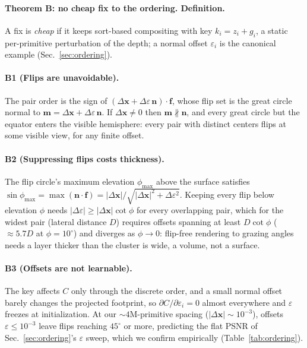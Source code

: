 \paragraph{Theorem B: no cheap fix to the ordering. Definition.} A fix is \emph{cheap} if it keeps
sort-based compositing with key $k_i=z_i+g_i$, a static per-primitive perturbation of the depth; a
normal offset $\varepsilon_i$ is the canonical example (Sec.~\ref{sec:ordering}).

\paragraph{B1 (Flips are unavoidable).} The pair order is the sign of
$(\Delta\mathbf{x}+\Delta\varepsilon\,\mathbf{n})\cdot\mathbf{f}$, whose flip set is the great
circle normal to $\mathbf{m}=\Delta\mathbf{x}+\Delta\varepsilon\,\mathbf{n}$. If
$\Delta\mathbf{x}\ne0$ then $\mathbf{m}\not\parallel\mathbf{n}$, and every great circle but the
equator enters the visible hemisphere: every pair with distinct centers flips at some visible view,
for any finite offset.

\paragraph{B2 (Suppressing flips costs thickness).} The flip circle's maximum elevation $\phi_{\max}$ above the surface satisfies
$\sin\phi_{\max}=\max(\mathbf{n}\cdot\mathbf{f})=|\Delta\mathbf{x}|/\sqrt{|\Delta\mathbf{x}|^2+\Delta\varepsilon^2}$.
Keeping every flip below elevation $\phi$ needs $|\Delta\varepsilon|\ge|\Delta\mathbf{x}|\cot\phi$
for every overlapping pair, which for the widest pair (lateral distance $D$) requires offsets
spanning at least $D\cot\phi$ ($\approx5.7D$ at $\phi=10^\circ$) and diverges as $\phi\to0$:
flip-free rendering to grazing angles needs a layer thicker than the cluster is wide, a volume, not
a surface.

\paragraph{B3 (Offsets are not learnable).} The key affects $C$ only through the discrete order,
and a small normal offset barely changes the projected footprint, so $\partial C/\partial
\varepsilon_i=0$ almost everywhere and $\varepsilon$ freezes at initialization. At our
$\sim\!4$M-primitive spacing ($|\Delta\mathbf{x}|\sim10^{-3}$), offsets $\varepsilon\le10^{-3}$
leave flips reaching $45^\circ$ or more, predicting the flat PSNR of Sec.~\ref{sec:ordering}'s
$\varepsilon$ sweep, which we confirm empirically (Table~\ref{tab:ordering}).

